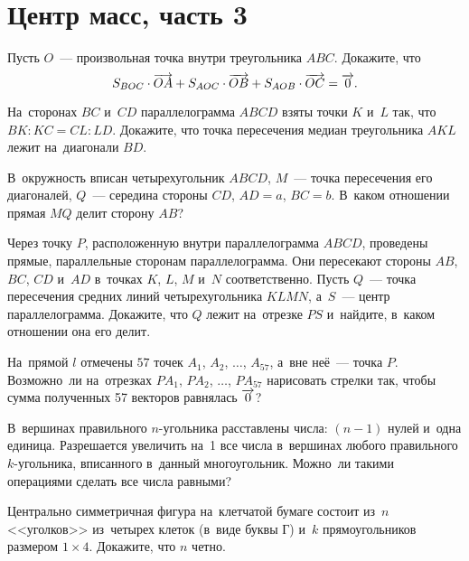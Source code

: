 

\section*{Центр масс, часть 3}


\begingroup\let\ov\overrightarrow

\begin{problems}

\item
Пусть $O$~--- произвольная точка внутри треугольника $ABC$.
Докажите, что
\[
    S_{BOC} \cdot \ov{OA} + S_{AOC} \cdot \ov{OB} + S_{AOB} \cdot \ov{OC}
=
    \ov{0}
.\]

\item
На~сторонах $BC$ и~$CD$ параллелограмма $ABCD$ взяты точки $K$ и~$L$ так, что
$BK : KC = CL : LD$.
Докажите, что точка пересечения медиан треугольника $AKL$ лежит на~диагонали
$BD$.

\item
В~окружность вписан четырехугольник $ABCD$, $M$~--- точка пересечения его
диагоналей, $Q$~--- середина стороны $CD$, $AD = a$, $BC = b$.
В~каком отношении прямая $MQ$ делит сторону $AB$?

\item
Через точку $P$, расположенную внутри параллелограмма $ABCD$, проведены прямые,
параллельные сторонам параллелограмма.
Они пересекают стороны $AB$, $BC$, $CD$ и~$AD$ в~точках $K$, $L$, $M$ и~$N$
соответственно.
Пусть $Q$~--- точка пересечения средних линий четырехугольника $KLMN$,
а~$S$~--- центр параллелограмма.
Докажите, что $Q$ лежит на~отрезке $PS$ и~найдите, в~каком отношении она его
делит.

\item
На~прямой $l$ отмечены $57$ точек $A_1$, $A_2$, $\ldots$, $A_{57}$, а~вне
неё~--- точка $P$.
Возможно~ли на~отрезках $P A_1$, $P A_2$, $\ldots$, $P A_{57}$ нарисовать
стрелки так, чтобы сумма полученных 57 векторов равнялась $\ov{0}$?

\item
В~вершинах правильного $n$-угольника расставлены числа: $(n-1)$ нулей и~одна
единица.
Разрешается увеличить на~1 все числа в~вершинах любого правильного
$k$-угольника, вписанного в~данный многоугольник.
Можно~ли такими операциями сделать все числа равными?

\item
Центрально симметричная фигура на~клетчатой бумаге состоит из~$n$ <<уголков>>
из~четырех клеток (в~виде буквы \textsf{Г}) и~$k$ прямоугольников размером
$1 \times 4$.
Докажите, что $n$ четно.


\end{problems}
